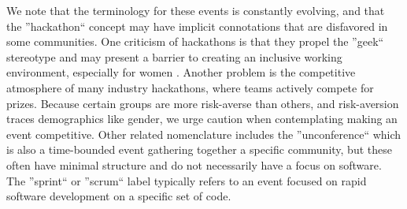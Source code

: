 We note that the terminology for these events is constantly evolving, and that the ''hackathon`` concept may have implicit connotations that are disfavored in some communities.
One criticism of hackathons is that they propel the ''geek`` stereotype and may present a barrier to creating an inclusive working environment, especially for women \cite{Decker2015}.
Another problem is the competitive atmosphere of many industry hackathons, where teams actively compete for prizes.
Because certain groups are more risk-averse than others, and risk-aversion traces demographics like gender, we urge caution when contemplating making an event competitive.
Other related nomenclature includes the ''unconference`` which is also a time-bounded event gathering together a specific community, but these often have minimal structure and do not necessarily have a focus on software.
The ''sprint`` or ''scrum`` label typically refers to an event focused on rapid software development on a specific set of code.
